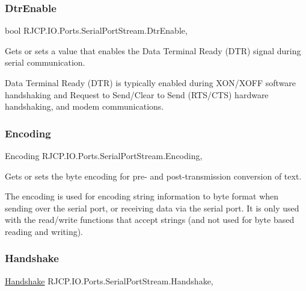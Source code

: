 \subsubsection{\texorpdfstring{DtrEnable}{DtrEnable}}
{\footnotesize\ttfamily bool R\+J\+C\+P.\+I\+O.\+Ports.\+Serial\+Port\+Stream.\+Dtr\+Enable\hspace{0.3cm}{\ttfamily [get]}, {\ttfamily [set]}}



Gets or sets a value that enables the Data Terminal Ready (D\+TR) signal during serial communication. 

Data Terminal Ready (D\+TR) is typically enabled during X\+O\+N/\+X\+O\+FF software handshaking and Request to Send/\+Clear to Send (R\+T\+S/\+C\+TS) hardware handshaking, and modem communications. \mbox{\label{class_r_j_c_p_1_1_i_o_1_1_ports_1_1_serial_port_stream_af85636a42969de8a6db531e6463b0574}} 
\subsubsection{\texorpdfstring{Encoding}{Encoding}}
{\footnotesize\ttfamily Encoding R\+J\+C\+P.\+I\+O.\+Ports.\+Serial\+Port\+Stream.\+Encoding\hspace{0.3cm}{\ttfamily [get]}, {\ttfamily [set]}}



Gets or sets the byte encoding for pre-\/ and post-\/transmission conversion of text. 

The encoding is used for encoding string information to byte format when sending over the serial port, or receiving data via the serial port. It is only used with the read/write functions that accept strings (and not used for byte based reading and writing). \mbox{\label{class_r_j_c_p_1_1_i_o_1_1_ports_1_1_serial_port_stream_a2f0a0ce1eabd620e65a396a0a84d08da}} 
\subsubsection{\texorpdfstring{Handshake}{Handshake}}
{\footnotesize\ttfamily \mbox{\hyperlink{namespace_r_j_c_p_1_1_i_o_1_1_ports_a5328e888558ed5726b3fb7b8b692527c}{Handshake}} R\+J\+C\+P.\+I\+O.\+Ports.\+Serial\+Port\+Stream.\+Handshake\hspace{0.3cm}{\ttfamily [get]}, {\ttfamily [set]}}



